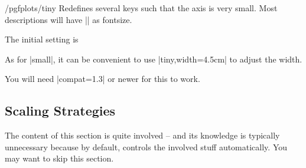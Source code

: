 \begin{stylekey}{/pgfplots/tiny}
    Redefines several keys such that the axis is very small. Most descriptions
    will have |\tiny| as fontsize.
\begin{codeexample}[]
\end{codeexample}
    The initial setting is
\begin{codeexample}
\end{codeexample}
    As for |small|, it can be convenient to use |tiny,width=4.5cm| to adjust
    the width.

    You will need |compat=1.3| or newer for this to work.
\end{stylekey}


\subsection{Scaling Strategies}

The content of this section is quite involved -- and its knowledge is typically
unnecessary because by default, \PGFPlots{} controls the involved stuff
automatically. You may want to skip this section.

